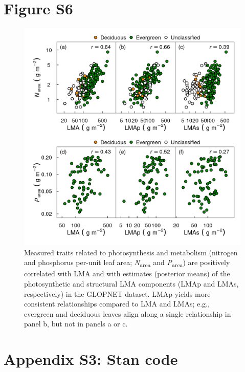\documentclass[
  12pt,
  letterpaper,
  DIV=11,
  numbers=noendperiod]{scrartcl}
\begin{document}
\newpage

\hypertarget{figure-s6}{%
\section{Figure S6}\label{figure-s6}}

\begin{figure}

{\centering \includegraphics{../figs/gl_point_np2.png}

}

\caption{\label{fig-glnp}Measured traits related to photosynthesis and
metabolism (nitrogen and phosphorus per-unit leaf area;
\emph{N}\textsubscript{area} and \emph{P}\textsubscript{area}) are
positively correlated with LMA and with estimates (posterior means) of
the photosynthetic and structural LMA components (LMAp and LMAs,
respectively) in the GLOPNET dataset. LMAp yields more consistent
relationships compared to LMA and LMAs; e.g., evergreen and deciduous
leaves align along a single relationship in panel b, but not in panels a
or c.}

\end{figure}

\hypertarget{appendix-s3-stan-code}{%
\section{Appendix S3: Stan code}\label{appendix-s3-stan-code}}
\end{document}

